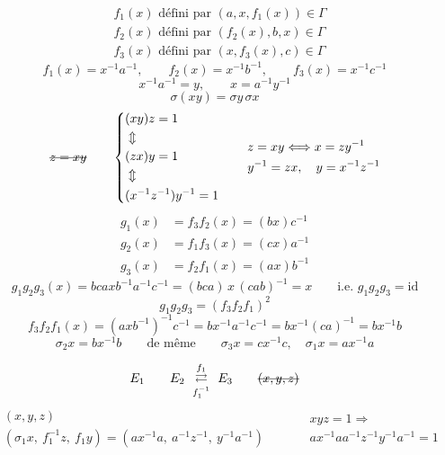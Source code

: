 \documentclass[11pt,a4paper]{article}
\begin{document}
\[
  \begin{aligned}
    &f_1(x) \text{ défini par } (a,x,f_1(x))\in\Gamma\\
    &f_2(x) \text{ défini par } (f_2(x),b,x)\in\Gamma\\
    &f_3(x) \text{ défini par } (x,f_3(x),c)\in\Gamma
  \end{aligned}
\]
\[
  f_1(x)=x^{-1}a^{-1},\qquad f_2(x)=x^{-1}b^{-1},\qquad f_3(x)=x^{-1}c^{-1}
\]
\[
  x^{-1}a^{-1}=y,\qquad x=a^{-1}y^{-1}
\]
\[
  \boxed{\sigma(xy)=\sigma y\,\sigma x}
\]
\[
  \text{\struck{$z=xy$}}\qquad
  \left\{
  \begin{aligned}
    &(xy)z=1\\ &\Updownarrow\\ &(zx)y=1\\ &\Updownarrow\\ &(x^{-1}z^{-1})y^{-1}=1
  \end{aligned}
  \right.
  \qquad
  \begin{aligned}
    &z=xy \Longleftrightarrow x=zy^{-1}\\
    &y^{-1}=zx,\quad y=x^{-1}z^{-1}
  \end{aligned}
\]
\[
  \begin{aligned}
    g_1(x)&=f_3f_2(x)=(bx)c^{-1}\\
    g_2(x)&=f_1f_3(x)=(cx)a^{-1}\\
    g_3(x)&=f_2f_1(x)=(ax)b^{-1}
  \end{aligned}
\]
\[
  g_1g_2g_3(x)=bcaxb^{-1}a^{-1}c^{-1}=(bca)\,x\,(cab)^{-1}=x\qquad\text{i.e. } g_1g_2g_3=\mathrm{id}
\]
\[
  g_1g_2g_3=(f_3f_2f_1)^2
\]
\[
  f_3f_2f_1(x)=(axb^{-1})^{-1}c^{-1}=bx^{-1}a^{-1}c^{-1}=bx^{-1}(ca)^{-1}=bx^{-1}b
\]
\[
  \sigma_2x=bx^{-1}b\qquad\text{de même}\qquad \sigma_3x=cx^{-1}c,\quad \sigma_1x=ax^{-1}a
\]

\[
  E_1\qquad E_2\ \underset{f_1^{-1}}{\overset{f_1}{\rightleftarrows}}\ E_3
  \qquad \text{\struck{$(x,y,z)$}}
\]
\[
  \begin{aligned}
    &(x,y,z)\\
    &(\sigma_1x,\ f_1^{-1}z,\ f_1y)=(ax^{-1}a,\ a^{-1}z^{-1},\ y^{-1}a^{-1})
  \end{aligned}
  \qquad
  \begin{aligned}
    &xyz=1\Longrightarrow\\
    &ax^{-1}aa^{-1}z^{-1}y^{-1}a^{-1}=1
  \end{aligned}
\]
\end{document}
